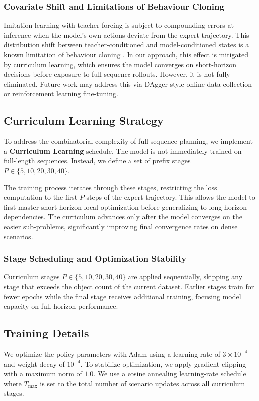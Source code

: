 \documentclass[conference]{IEEEtran}
\begin{document}
\subsubsection{Covariate Shift and Limitations of Behaviour Cloning}
Imitation learning with teacher forcing is subject to compounding errors at inference when the model's own actions deviate from the expert trajectory. This distribution shift between teacher-conditioned and model-conditioned states is a known limitation of behaviour cloning \cite{ross2011dagger}. In our approach, this effect is mitigated by curriculum learning, which ensures the model converges on short-horizon decisions before exposure to full-sequence rollouts. However, it is not fully eliminated. Future work may address this via DAgger-style online data collection \cite{ross2011dagger} or reinforcement learning fine-tuning.

\subsection{Curriculum Learning Strategy}
To address the combinatorial complexity of full-sequence planning, we implement a \textbf{Curriculum Learning} schedule. The model is not immediately trained on full-length sequences. Instead, we define a set of prefix stages $P \in \{5, 10, 20, 30, 40\}$.

The training process iterates through these stages, restricting the loss computation to the first $P$ steps of the expert trajectory. This allows the model to first master short-horizon local optimization before generalizing to long-horizon dependencies. The curriculum advances only after the model converges on the easier sub-problems, significantly improving final convergence rates on dense scenarios.

\subsubsection{Stage Scheduling and Optimization Stability}
Curriculum stages $P \in \{5,10,20,30,40\}$ are applied sequentially, skipping any stage that exceeds the object count of the current dataset.
Earlier stages train for fewer epochs while the final stage receives additional training, focusing model capacity on full-horizon performance.

\subsection{Training Details}
We optimize the policy parameters with Adam using a learning rate of $3\times 10^{-4}$ and weight decay of $10^{-4}$.
To stabilize optimization, we apply gradient clipping with a maximum norm of $1.0$.
We use a cosine annealing learning-rate schedule where $T_{\max}$ is set to the total number of scenario updates across all curriculum stages.
\end{document}

